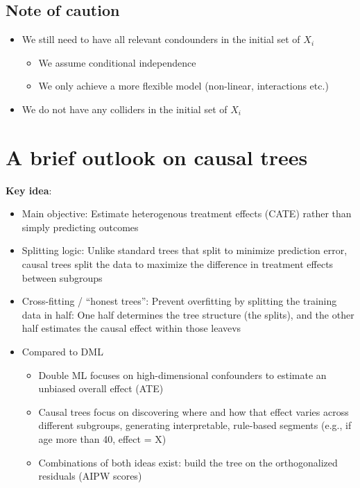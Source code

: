 \documentclass[10pt]{article}
\begin{document}
\subsection{Note of caution}
\begin{itemize}
    \item We still need to have all relevant condounders in the initial set of $X_i $
    \begin{itemize}
        \item We assume conditional independence
        \item We only achieve a more flexible model (non-linear, interactions etc.)
    \end{itemize}
    \item We do not have any colliders in the initial set of $X_i $
\end{itemize}
\section{A brief outlook on causal trees}
\textbf{Key idea}:
\begin{itemize}
    \item Main objective: Estimate heterogenous treatment effects (CATE) rather than simply predicting outcomes 
    \item Splitting logic: Unlike standard trees that split to minimize prediction error, causal trees split the data to maximize the difference in treatment effects between subgroups 
    \item Cross-fitting / ``honest trees'': Prevent overfitting by splitting the training data in half: One half determines the tree structure (the splits), and the other half estimates the causal effect within those leavevs 
    \item Compared to DML
    \begin{itemize}
        \item Double ML focuses on high-dimensional confounders to estimate an unbiased overall effect (ATE)
        \item Causal trees focus on discovering where and how that effect varies across different subgroups, generating interpretable, rule-based segments (e.g., if age more than 40, effect = X)
        \item Combinations of both ideas exist: build the tree on the orthogonalized residuals (AIPW scores)
    \end{itemize}
\end{itemize}
\end{document}
